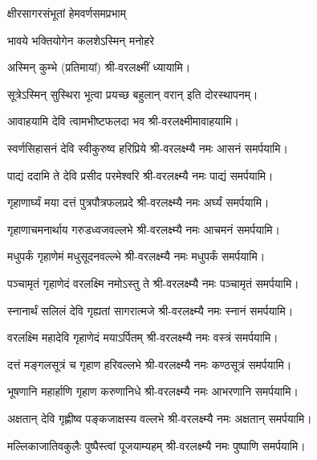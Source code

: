 \begin{center}

{क्षीरसागरसंभूतां हेमवर्णसमप्रभाम्}

{भावये भक्तियोगेन कलशेऽस्मिन् मनोहरे} 

अस्मिन् कुम्भे (प्रतिमायां) श्री-वरलक्ष्मीं ध्यायामि।
\medskip


{सूत्रेऽस्मिन् सुस्थिरा भूत्वा प्रयच्छ बहुलान् वरान्} 
इति दोरस्थापनम्।\medskip

{आवाहयामि देवि त्वामभीष्टफलदा भव}
श्री-वरलक्ष्मीमावाहयामि।

{स्वर्णसिहासनं देवि स्वीकुरुष्व हरिप्रिये} 
श्री-वरलक्ष्म्यै नमः आसनं समर्पयामि।


{पाद्यं ददामि ते देवि प्रसीद परमेश्वरि}
श्री-वरलक्ष्म्यै नमः पाद्यं समर्पयामि।\medskip

{गृहाणार्घ्यं मया दत्तं पुत्रपौत्रफलप्रदे}
श्री-वरलक्ष्म्यै नमः अर्घ्यं समर्पयामि।\medskip

{गृहाणाचमनार्थाय गरुडध्वजवल्लभे}
श्री-वरलक्ष्म्यै नमः आचमनं समर्पयामि।\medskip

{मधुपर्कं गृहाणेमं मधुसूदनवल्ल्भे}
श्री-वरलक्ष्म्यै नमः मधुपर्कं समर्पयामि।\medskip

{पञ्चामृतं गृहाणेदं वरलक्ष्मि नमोऽस्तु ते}
श्री-वरलक्ष्म्यै नमः पञ्चामृतं समर्पयामि।\medskip

{स्नानार्थं सलिलं देवि गृह्यतां सागरात्मजे}
श्री-वरलक्ष्म्यै नमः स्नानं समर्पयामि।\medskip

{वरलक्ष्मि महादेवि गृहाणेदं मयाऽर्पितम्}
श्री-वरलक्ष्म्यै नमः वस्त्रं समर्पयामि।\medskip

{दत्तं मङ्गलसूत्रं च गृहाण हरिवल्लभे}
श्री-वरलक्ष्म्यै नमः कण्ठसूत्रं समर्पयामि।\medskip

{भूषणानि महार्हाणि गृहाण करुणानिधे}
श्री-वरलक्ष्म्यै नमः आभरणानि समर्पयामि।\medskip

{अक्षतान् देवि गृह्णीष्व पङ्कजाक्षस्य वल्लभे}
श्री-वरलक्ष्म्यै नमः अक्षतान् समर्पयामि।\medskip


{मल्लिकाजातिवकुलैः पुष्पैस्त्वां पूजयाम्यहम्}
श्री-वरलक्ष्म्यै नमः पुष्पाणि समर्पयामि।\medskip

 
\end{center}


